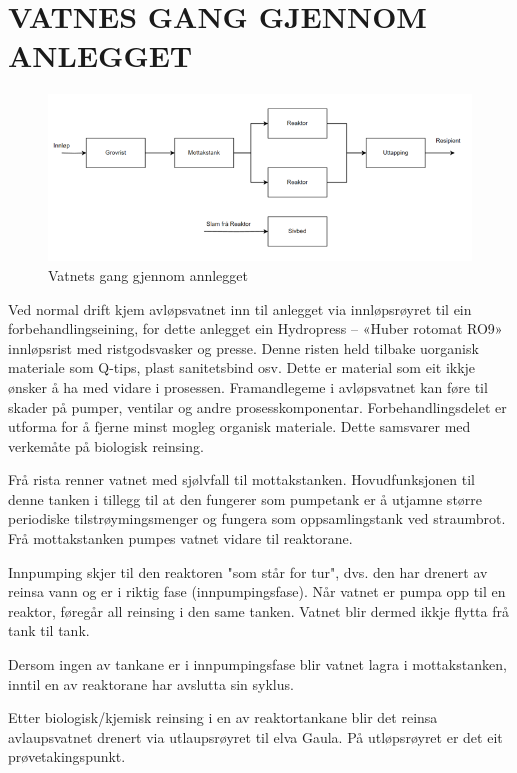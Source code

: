 \newpage
\section{VATNES GANG GJENNOM ANLEGGET}
\begin{figure}[htbp]
    \centering
    \includegraphics[width=1\textwidth]{Figurar/VannetsGangGjennomAnlegget.png}
    \caption{Vatnets gang gjennom annlegget}\label{fig:Vatnets Gang}
\end{figure}

Ved normal drift kjem avløpsvatnet inn til anlegget via innløpsrøyret til ein forbehandlingseining, for dette anlegget ein Hydropress – «Huber rotomat RO9» innløpsrist med ristgodsvasker og presse.
Denne risten held tilbake uorganisk materiale som Q-tips, plast sanitetsbind osv. Dette er material som eit ikkje ønsker å ha med vidare i prosessen. 
Framandlegeme i avløpsvatnet kan føre til skader på pumper, ventilar og andre prosesskomponentar. Forbehandlingsdelet er utforma for å fjerne minst mogleg organisk materiale. Dette samsvarer med verkemåte på biologisk reinsing.

Frå rista renner vatnet med sjølvfall til mottakstanken. Hovudfunksjonen til denne tanken i tillegg til at den fungerer som pumpetank er å utjamne større periodiske tilstrøymingsmenger og fungera som oppsamlingstank ved straumbrot. 
Frå mottakstanken pumpes vatnet vidare til reaktorane. 

Innpumping skjer til den reaktoren "som står for tur", dvs. den har drenert av reinsa vann og er i riktig fase (innpumpingsfase). 
Når vatnet er pumpa opp til en reaktor, føregår all reinsing i den same tanken. Vatnet blir dermed ikkje flytta frå tank til tank.

Dersom ingen av tankane er i innpumpingsfase blir vatnet lagra i mottakstanken, inntil en av reaktorane har avslutta sin syklus.

Etter biologisk/kjemisk reinsing i en av reaktortankane blir det reinsa avlaupsvatnet drenert via utlaupsrøyret til elva Gaula. 
På utløpsrøyret er det eit prøvetakingspunkt. 





    